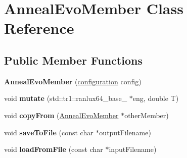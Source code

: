 \hypertarget{class_anneal_evo_member}{\section{Anneal\-Evo\-Member Class Reference}
\label{class_anneal_evo_member}
}
\subsection*{Public Member Functions}
\begin{DoxyCompactItemize}
\item 
\hypertarget{class_anneal_evo_member_a1c0d923faddfb7b5228eb16b7107e916}{{\bfseries Anneal\-Evo\-Member} (\hyperlink{classconfiguration}{configuration} config)}\label{class_anneal_evo_member_a1c0d923faddfb7b5228eb16b7107e916}

\item 
\hypertarget{class_anneal_evo_member_a5d01b30e70e68731fdbb7196916a9f90}{void {\bfseries mutate} (std\-::tr1\-::ranlux64\-\_\-base\-\_ $\ast$eng, double T)}\label{class_anneal_evo_member_a5d01b30e70e68731fdbb7196916a9f90}

\item 
\hypertarget{class_anneal_evo_member_aca0fda410629a7e291cf9639aafed305}{void {\bfseries copy\-From} (\hyperlink{class_anneal_evo_member}{Anneal\-Evo\-Member} $\ast$other\-Member)}\label{class_anneal_evo_member_aca0fda410629a7e291cf9639aafed305}

\item 
\hypertarget{class_anneal_evo_member_a8f90ad07fc150672328e9dfb92ce5478}{void {\bfseries save\-To\-File} (const char $\ast$output\-Filename)}\label{class_anneal_evo_member_a8f90ad07fc150672328e9dfb92ce5478}

\item 
\hypertarget{class_anneal_evo_member_ab246fd1e493ea859d79431f2658a89b8}{void {\bfseries load\-From\-File} (const char $\ast$input\-Filename)}\label{class_anneal_evo_member_ab246fd1e493ea859d79431f2658a89b8}

\end{DoxyCompactItemize}
